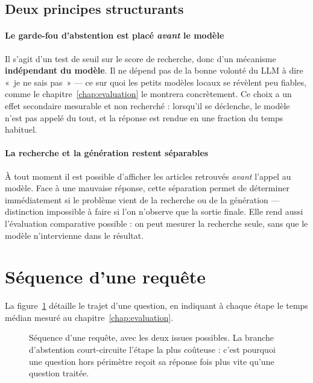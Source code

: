 \subsection{Deux principes structurants}

\paragraph{Le garde-fou d'abstention est placé \emph{avant} le modèle}
Il s'agit d'un test de seuil sur le score de recherche, donc d'un mécanisme
\textbf{indépendant du modèle}. Il ne dépend pas de la bonne volonté du LLM à dire «~je ne sais
pas~» --- ce sur quoi les petits modèles locaux se révèlent peu fiables, comme le
chapitre~\ref{chap:evaluation} le montrera concrètement. Ce choix a un effet secondaire mesurable
et non recherché : lorsqu'il se déclenche, le modèle n'est pas appelé du tout, et la réponse est
rendue en une fraction du temps habituel.

\paragraph{La recherche et la génération restent séparables}
À tout moment il est possible d'afficher les articles retrouvés \emph{avant} l'appel au modèle.
Face à une mauvaise réponse, cette séparation permet de déterminer immédiatement si le problème
vient de la recherche ou de la génération --- distinction impossible à faire si l'on n'observe que
la sortie finale. Elle rend aussi l'évaluation comparative possible : on peut mesurer la recherche
seule, sans que le modèle n'intervienne dans le résultat.

\section{Séquence d'une requête}

La figure~\ref{fig:sequence} détaille le trajet d'une question, en indiquant à chaque étape le
temps médian mesuré au chapitre~\ref{chap:evaluation}.

\begin{figure}[htbp]
  \centering
  
  \caption[Séquence d'une requête]{Séquence d'une requête, avec les deux issues possibles. La
  branche d'abstention court-circuite l'étape la plus coûteuse : c'est pourquoi une question hors
  périmètre reçoit sa réponse \FacteurGarde{} fois plus vite qu'une question traitée.}
  \label{fig:sequence}
\end{figure}

